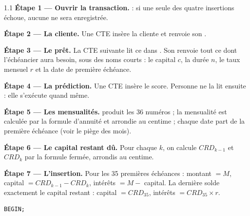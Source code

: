 \begin{correction}{1.1}
\textbf{Étape 1 --- Ouvrir la transaction.}  : si une seule des quatre insertions échoue,
aucune ne sera enregistrée.

\textbf{Étape 2 --- La cliente.} Une CTE insère la cliente et renvoie son .

\textbf{Étape 3 --- Le prêt.} La CTE suivante lit ce  dans . Son
 renvoie tout ce dont l'échéancier aura besoin, sous des noms courts : le capital $c$,
la durée $n$, le taux mensuel $r$ et la date de première échéance.

\textbf{Étape 4 --- La prédiction.} Une CTE insère le score. Personne ne la lit ensuite : elle
s'exécute quand même.

\textbf{Étape 5 --- Les mensualités.}  produit les 36 numéros ; la mensualité
est calculée par la formule d'annuité et arrondie au centime ; chaque date part de la première
échéance (voir le piège des mois).

\textbf{Étape 6 --- Le capital restant dû.} Pour chaque $k$, on calcule $CRD_{k-1}$ et $CRD_k$ par la
formule fermée, arrondis au centime.

\textbf{Étape 7 --- L'insertion.} Pour les 35 premières échéances : montant $= M$, capital
$= CRD_{k-1} - CRD_k$, intérêts $= M -$ capital. La dernière solde exactement le capital restant :
capital $= CRD_{35}$, intérêts $= CRD_{35} \times r$.

\begin{lstlisting}[style=long]
BEGIN;


\end{lstlisting}
\end{correction}
